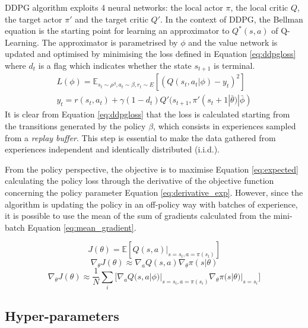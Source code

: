 \documentclass[letterpaper]{article}
\begin{document}
DDPG algorithm exploits 4 neural networks: the local actor $\pi$, the local critic $Q$, the target actor $\pi'$ and the target critic $Q'$.
In the context of DDPG, the Bellman equation is the starting point for learning an approximator to $Q^*(s,a)$ of Q-Learning.
The approximator is parametrised by $\phi$ and the value network is updated and optimised by minimising the loss defined in Equation \ref{eq:ddpgloss} where $d_t$ is a flag which indicates whether the  state $s_{t+1}$ is terminal.
\begin{equation}\label{eq:ddpgloss}
	\begin{gathered}
		L(\phi) = \mathbb{E}_{s_t\sim \rho^\beta, a_t\sim \beta,r_t\sim E}[(Q(s_t, a_t|\phi)-y_t)^2] \\
		y_t = r(s_t, a_t) + \gamma (1-d_t)Q'(s_{t+1}, \pi'(s_t+1|\bar{\theta})|\bar{\phi})
	\end{gathered}
\end{equation}
It is clear from Equation \ref{eq:ddpgloss} that the loss is calculated starting from the transitions generated by the policy $\beta$, which consists in experiences sampled from a \textit{replay buffer}. This step is essential to make the data gathered from experiences independent and identically distributed (i.i.d.).

From the policy perspective, the objective is to maximise Equation \ref{eq:expected} calculating the policy loss through the derivative of the objective function concerning the policy parameter Equation \ref{eq:derivative_exp}.
However, since the algorithm is updating the policy in an off-policy way with batches of experience, it is possible to use the mean of the sum of gradients calculated from the mini-batch Equation \ref{eq:mean_gradient}.

\begin{equation}\label{eq:expected}
	J(\theta) = \mathbb{E}[Q(s,a)|_{s=s_t,a=\pi(s_t)}]
\end{equation}
\begin{equation}\label{eq:derivative_exp}
	\nabla_{\theta} J(\theta) \approx \nabla_a Q(s,a) \nabla_{\theta}\pi(s|\theta)
\end{equation}
\begin{equation}\label{eq:mean_gradient}
	\nabla_{\theta} J(\theta) \approx \frac{1}{N}\sum_{i}\big[\nabla_a Q(s,a| \phi)|_{s=s_i, a = \pi(s_i)} \nabla_{\theta}\pi(s|\theta)|_{s=s_i}\big]
\end{equation}

\subsection{Hyper-parameters}
\end{document}
